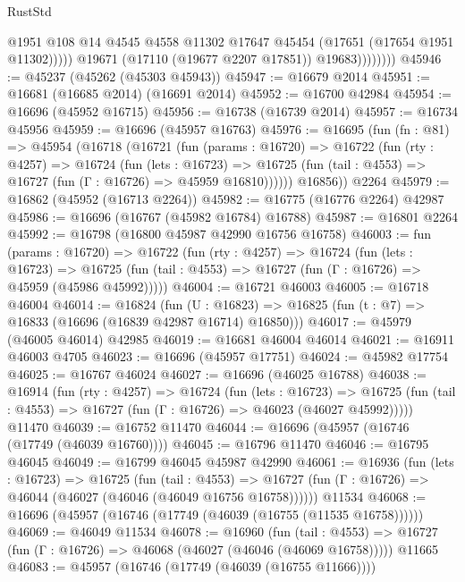 \begin{lexlean}{RustStd}
\begin{coremodule}
                          @1951
                          @108
                          @14
                          @4545
                          @4558
                          @11302
                          @17647
                          @45454
                          (@17651 (@17654 @1951 @11302)))))
                    @19671
                    (@17110 (@19677 @2207 @17851))
                    @19683))))))))
@45946 := @45237 (@45262 (@45303 @45943))
@45947 := @16679 @2014
@45951 := @16681 (@16685 @2014) (@16691 @2014)
@45952 := @16700 @42984
@45954 := @16696 (@45952 @16715)
@45956 := @16738 (@16739 @2014)
@45957 := @16734 @45956
@45959 := @16696 (@45957 @16763)
@45976 := @16695
    (fun (fn : @81) =>
    @45954
      (@16718
        (@16721
          (fun (params : @16720) =>
          @16722
            (fun (rty : @4257) =>
            @16724
              (fun (lets : @16723) =>
              @16725 (fun (tail : @4553) => @16727 (fun (Γ : @16726) => @45959 @16810))))))
        @16856))
    @2264
@45979 := @16862 (@45952 (@16713 @2264))
@45982 := @16775 (@16776 @2264) @42987
@45986 := @16696 (@16767 (@45982 @16784) @16788)
@45987 := @16801 @2264
@45992 := @16798 (@16800 @45987 @42990 @16756 @16758)
@46003 := fun (params : @16720) =>
  @16722
    (fun (rty : @4257) =>
    @16724
      (fun (lets : @16723) =>
      @16725 (fun (tail : @4553) => @16727 (fun (Γ : @16726) => @45959 (@45986 @45992)))))
@46004 := @16721 @46003
@46005 := @16718 @46004
@46014 := @16824
    (fun (U : @16823) => @16825 (fun (t : @7) => @16833 (@16696 (@16839 @42987 @16714) @16850)))
@46017 := @45979 (@46005 @46014) @42985
@46019 := @16681 @46004 @46014
@46021 := @16911 @46003 @4705
@46023 := @16696 (@45957 @17751)
@46024 := @45982 @17754
@46025 := @16767 @46024
@46027 := @16696 (@46025 @16788)
@46038 := @16914
    (fun (rty : @4257) =>
    @16724
      (fun (lets : @16723) =>
      @16725 (fun (tail : @4553) => @16727 (fun (Γ : @16726) => @46023 (@46027 @45992)))))
    @11470
@46039 := @16752 @11470
@46044 := @16696 (@45957 (@16746 (@17749 (@46039 @16760))))
@46045 := @16796 @11470
@46046 := @16795 @46045
@46049 := @16799 @46045 @45987 @42990
@46061 := @16936
    (fun (lets : @16723) =>
    @16725
      (fun (tail : @4553) =>
      @16727 (fun (Γ : @16726) => @46044 (@46027 (@46046 (@46049 @16756 @16758))))))
    @11534
@46068 := @16696 (@45957 (@16746 (@17749 (@46039 (@16755 (@11535 @16758))))))
@46069 := @46049 @11534
@46078 := @16960
    (fun (tail : @4553) => @16727 (fun (Γ : @16726) => @46068 (@46027 (@46046 (@46069 @16758)))))
    @11665
@46083 := @45957 (@16746 (@17749 (@46039 (@16755 @11666))))

\end{coremodule}
\end{lexlean}

